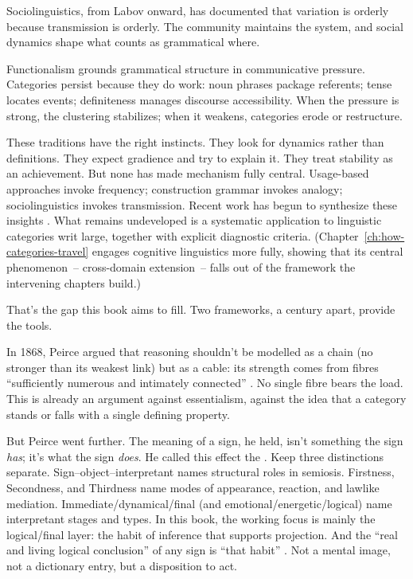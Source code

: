 Sociolinguistics, from Labov onward, has documented that variation is orderly because transmission is orderly. The community maintains the system, and social dynamics shape what counts as grammatical where.

Functionalism grounds grammatical structure in communicative pressure. Categories persist because they do work: noun phrases package referents; tense locates events; definiteness manages discourse accessibility. When the pressure is strong, the clustering stabilizes; when it weakens, categories erode or restructure.

These traditions have the right instincts. They look for dynamics rather than definitions. They expect gradience and try to explain it. They treat stability as an achievement. But none has made mechanism fully central. Usage-based approaches invoke frequency; construction grammar invokes analogy; sociolinguistics invokes transmission. Recent work has begun to synthesize these insights \citep{schmid2020,spike2020,dahl2016}. What remains undeveloped is a systematic application to linguistic categories writ large, together with explicit diagnostic criteria. (Chapter~\ref{ch:how-categories-travel} engages cognitive linguistics more fully, showing that its central phenomenon~-- cross-domain extension~-- falls out of the framework the intervening chapters build.)

That's the gap this book aims to fill. Two frameworks, a century apart, provide the tools.

In 1868, Peirce argued that reasoning shouldn't be modelled as a chain (no stronger than its weakest link) but as a cable: its strength comes from fibres \enquote{sufficiently numerous and intimately connected} \citep[CP~5.265]{peirce1931cp}. No single fibre bears the load. This is already an argument against essentialism, against the idea that a category stands or falls with a single defining property.

But Peirce went further. The meaning of a sign, he held, isn't something the sign \emph{has}; it's what the sign \emph{does}. He called this effect the . Keep three distinctions separate. Sign--object--interpretant names structural roles in semiosis. Firstness, Secondness, and Thirdness name modes of appearance, reaction, and lawlike mediation. Immediate/dynamical/final (and emotional/energetic/logical) name interpretant stages and types. In this book, the working focus is mainly the logical/final layer: the habit of inference that supports projection. And the \enquote{real and living logical conclusion} of any sign is \enquote{that habit} \citep[CP~5.491]{peirce1931cp}. Not a mental image, not a dictionary entry, but a disposition to act.

